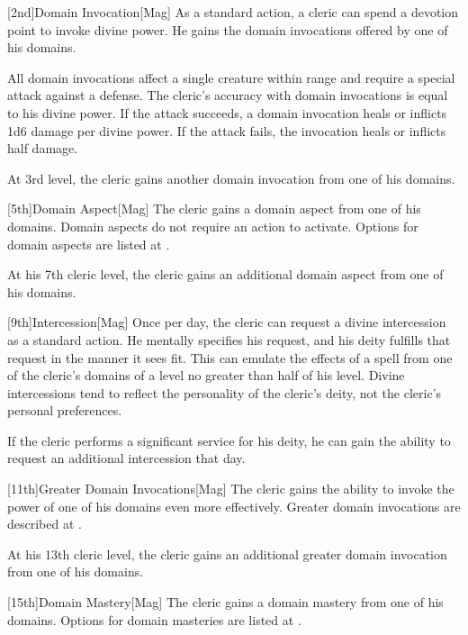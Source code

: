         [2nd]{Domain Invocation}[Mag]
        As a standard action, a cleric can spend a devotion point to invoke divine power.
        He gains the domain invocations offered by one of his domains.

        All domain invocations affect a single creature within \rngmed range and require a special attack against a defense.
        The cleric's accuracy with domain invocations is equal to his divine power.
        If the attack succeeds, a domain invocation heals or inflicts 1d6 damage per divine power.
        If the attack fails, the invocation heals or inflicts half damage.

        At 3rd level, the cleric gains another domain invocation from one of his domains.

        [5th]{Domain Aspect}[Mag]
        The cleric gains a domain aspect from one of his domains.
        Domain aspects do not require an action to activate.
        Options for domain aspects are listed at .

        At his 7th cleric level, the cleric gains an additional domain aspect from one of his domains.

        [9th]{Intercession}[Mag]
        Once per day, the cleric can request a divine intercession as a standard action.
        He mentally specifies his request, and his deity fulfills that request in the manner it sees fit.
        This can emulate the effects of a spell from one of the cleric's domains of a level no greater than half of his level.
        Divine intercessions tend to reflect the personality of the cleric's deity, not the cleric's personal preferences.

        If the cleric performs a significant service for his deity, he can gain the ability to request an additional intercession that day.

        [11th]{Greater Domain Invocations}[Mag]
        The cleric gains the ability to invoke the power of one of his domains even more effectively.
        Greater domain invocations are described at .

        At his 13th cleric level, the cleric gains an additional greater domain invocation from one of his domains.

        [15th]{Domain Mastery}[Mag]
        The cleric gains a domain mastery from one of his domains.
        Options for domain masteries are listed at .

